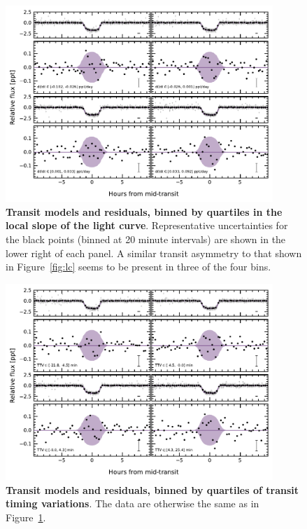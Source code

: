 \documentclass[12pt,modern,twocolumn,tighten]{aastex63}
\begin{document}
\begin{figure}[tp]
	\begin{center}
		\leavevmode
		\includegraphics[width=0.9\textwidth]{f11.pdf}
	\end{center}
	\vspace{-0.7cm}
	\caption{
    {\bf Transit models and residuals, binned by quartiles in the
    local slope of the light curve}.  
    Representative uncertainties for the black points (binned at 20
    minute intervals) are shown in the lower right of each panel.  A
    similar transit asymmetry to that shown in Figure~\ref{fig:lc}
    seems to be present in three of the four bins.
    \vspace{-0.5cm}
		\label{fig:phaseslope}
	}
\end{figure}
\begin{figure}[tp]
	\begin{center}
		\leavevmode
		\includegraphics[width=0.9\textwidth]{f12.pdf}
	\end{center}
	\vspace{-0.7cm}
	\caption{
    {\bf Transit models and residuals, binned by quartiles of transit
    timing variations}.  The data are otherwise the same as in
    Figure~\ref{fig:phaseslope}.
		\label{fig:phasettv}
	}
\end{figure}
\end{document}

